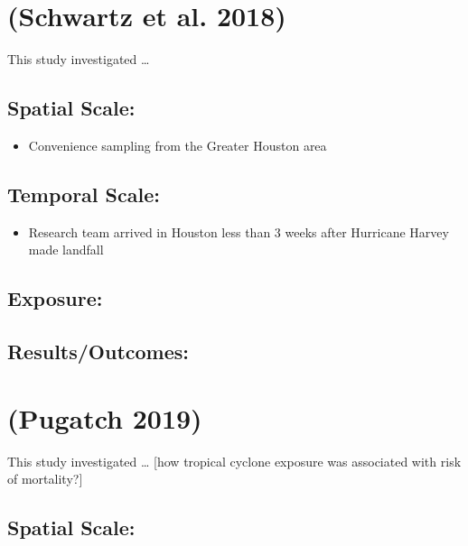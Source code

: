 \documentclass[
]{article}
\providecommand{\tightlist}{%
  \setlength{\itemsep}{0pt}\setlength{\parskip}{0pt}}
\begin{document}
\hypertarget{schwartz2018preliminary}{%
\section{(Schwartz et al. 2018)}\label{schwartz2018preliminary}}

This study investigated \ldots{}

\hypertarget{spatial-scale-10}{%
\subsection{Spatial Scale:}\label{spatial-scale-10}}

\begin{itemize}
\tightlist
\item
  Convenience sampling from the Greater Houston area
\end{itemize}

\hypertarget{temporal-scale-10}{%
\subsection{Temporal Scale:}\label{temporal-scale-10}}

\begin{itemize}
\tightlist
\item
  Research team arrived in Houston less than 3 weeks after Hurricane
  Harvey made landfall
\end{itemize}

\hypertarget{exposure-9}{%
\subsection{Exposure:}\label{exposure-9}}

\hypertarget{resultsoutcomes-9}{%
\subsection{Results/Outcomes:}\label{resultsoutcomes-9}}

\hypertarget{pugatch2019tropical}{%
\section{(Pugatch 2019)}\label{pugatch2019tropical}}

This study investigated \ldots{} {[}how tropical cyclone exposure was
associated with risk of mortality?{]}

\hypertarget{spatial-scale-11}{%
\subsection{Spatial Scale:}\label{spatial-scale-11}}
\end{document}
